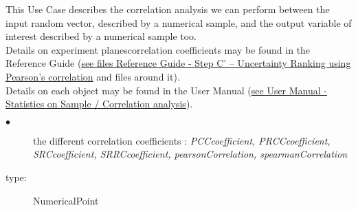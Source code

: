 \renewcommand{\filename}{docUC_CentralUncertainty_CorrelationAnalysis.tex}
\renewcommand{\filetitle}{UC : Correlation analysis on samples : Pearson and Spearman coefficients, PCC, PRCC, SRC, SRRC coefficients}

\HeaderIIILevel

\label{correlationAnalysis}




This Use Case  describes the correlation analysis we can perform between the input random  vector, described by a numerical sample, and the output variable of interest described by a numerical sample too.\\

Details on experiment planescorrelation coefficients may be found in the Reference Guide (\href{OpenTURNS_ReferenceGuide.pdf}{see files Reference Guide - Step C' -- Uncertainty Ranking using Pearson's correlation} and files around it).\\

Details on each object may be found in the User Manual  (\href{OpenTURNS_UserManual_TUI.pdf}{see User Manual - Statistics on Sample / Correlation analysis}).\\


{
  \begin{description}
  \item[$\bullet$] the different correlation coefficients : {\itshape PCCcoefficient, PRCCcoefficient, SRCcoefficient, SRRCcoefficient, pearsonCorrelation, spearmanCorrelation}
  \item[type:] NumericalPoint
  \end{description}
}

